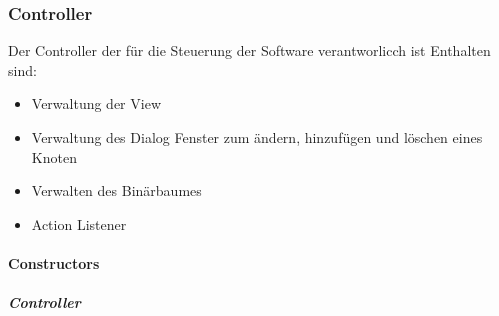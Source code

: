 \documentclass[letterpaper,10pt,ngerman]{sphinxmanual}
\begin{document}
\subsubsection{Controller}
\label{\detokenize{com/linuxluigi/edu/Controller:controller}}\label{\detokenize{com/linuxluigi/edu/Controller::doc}}

\begin{fulllineitems}
\label{\detokenize{com/linuxluigi/edu/Controller:com.linuxluigi.edu.Controller}}
Der Controller der für die Steuerung der Software verantworlicch ist Enthalten sind:
\begin{itemize}
\item {} 
Verwaltung der View

\item {} 
Verwaltung des Dialog Fenster zum ändern, hinzufügen und löschen eines Knoten

\item {} 
Verwalten des Binärbaumes

\item {} 
Action Listener

\end{itemize}

\end{fulllineitems}



\paragraph{Constructors}
\label{\detokenize{com/linuxluigi/edu/Controller:constructors}}

\subparagraph{Controller}
\label{\detokenize{com/linuxluigi/edu/Controller:id1}}
\end{document}

